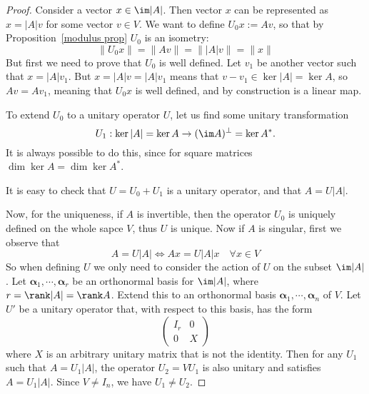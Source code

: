 \begin{proof}
Consider a vector $x\in\im|A|$. Then vector $x$ can be represented as $x=|A|v$ for some vector $v\in V$. We want to define $U_0x:=Av$, so that by Proposition~\ref{modulus prop} $U_0$ is an isometry:
\[\|U_0x\|=\|Av\|=\||A|v\|=\|x\|\] 
But first we need to prove that $U_0$ is well defined. Let $v_1$ be another vector such that $x=|A|v_1$. But $x=|A|v=|A|v_1$ means that $v-v_1\in\ker|A|=\ker A$, so $Av=Av_1$, meaning that $U_0x$ is well defined, and by construction is a linear map.\par
To extend $U_0$ to a unitary operator $U$, let us find some unitary transformation 
\[U_1:\ker|A|=\ker A\to(\im A)^\bot=\ker A^*.\] 
It is always possible to do this, since for square matrices $\dim\ker A=\dim\ker A^*$.\par
It is easy to check that $U=U_0+U_1$ is a unitary operator, and that $A=U|A|$.\par
Now, for the uniqueness, if $A$ is invertible, then the operator $U_0$ is uniquely defined on the whole sapce $V$, thus $U$ is unique.
Now if $A$ is singular, first we observe that
\[A=U|A|\iff Ax=U|A|x\quad\forall x\in V\]
So when defining $U$ we only need to consider the action of $U$ on the subset $\im|A|$. Let $\bm{\alpha}_1,\cdots,\bm{\alpha}_r$ be an orthonormal basis for $\im|A|$, where $r=\rank|A|=\rank A$. Extend this to an orthonormal basis $\bm{\alpha}_1,\cdots,\bm{\alpha}_n$ of $V$. Let $U'$ be a unitary operator that, with respect to this basis, has the form
\[\begin{pmatrix}
I_r&0\\
0&X
\end{pmatrix}\]
where $X$ is an arbitrary unitary matrix that is not the identity. Then for any $U_1$ such that $A=U_1|A|$, the operator $U_2=VU_1$ is also unitary and satisfies $A=U_1|A|$. Since $V\neq I_n$, we have $U_1\neq U_2$.
\end{proof}
